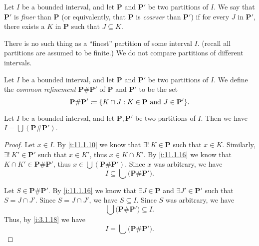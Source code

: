 \begin{defn}\label{i:11.1.14}
  Let \(I\) be a bounded interval, and let \(\mathbf{P}\) and \(\mathbf{P}'\) be two partitions of \(I\).
  We say that \(\mathbf{P}'\) is \emph{finer} than \(\mathbf{P}\) (or equivalently, that \(\mathbf{P}\) is \emph{coarser} than \(\mathbf{P}'\)) if for every \(J\) in \(\mathbf{P}'\), there exists a \(K\) in \(\mathbf{P}\) such that \(J \subseteq K\).
\end{defn}

\begin{note}
  There is no such thing as a ``finest'' partition of some interval \(I\).
  (recall all partitions are assumed to be finite.)
  We do not compare partitions of different intervals.
\end{note}

\setcounter{thm}{15}
\begin{defn}\label{i:11.1.16}
  Let \(I\) be a bounded interval, and let \(\mathbf{P}\) and \(\mathbf{P}'\) be two partitions of \(I\).
  We define the \emph{common refinement} \(\mathbf{P} \# \mathbf{P}'\) of \(\mathbf{P}\) and \(\mathbf{P}'\) to be the set
  \[
    \mathbf{P} \# \mathbf{P}' \coloneqq \set{K \cap J : K \in \mathbf{P} \text{ and } J \in \mathbf{P}'}.
  \]
\end{defn}

\begin{ac}\label{i:ac:11.1.1}
  Let \(I\) be a bounded interval, and let \(\mathbf{P}, \mathbf{P}'\) be two partitions of \(I\).
  Then we have \(I = \bigcup (\mathbf{P} \# \mathbf{P}')\).
\end{ac}

\begin{proof}
  Let \(x \in I\).
  By \cref{i:11.1.10} we know that \(\exists!\ K \in \mathbf{P}\) such that \(x \in K\).
  Similarly, \(\exists!\ K' \in \mathbf{P}'\) such that \(x \in K'\), thus \(x \in K \cap K'\).
  By \cref{i:11.1.16} we know that \(K \cap K' \in \mathbf{P} \# \mathbf{P}'\), thus \(x \in \bigcup (\mathbf{P} \# \mathbf{P}')\).
  Since \(x\) was arbitrary, we have
  \[
    I \subseteq \bigcup \big(\mathbf{P} \# \mathbf{P}'\big).
  \]

  Let \(S \in \mathbf{P} \# \mathbf{P}'\).
  By \cref{i:11.1.16} we know that \(\exists J \in \mathbf{P}\) and \(\exists J' \in \mathbf{P}'\) such that \(S = J \cap J'\).
  Since \(S = J \cap J'\), we have \(S \subseteq I\).
  Since \(S\) was arbitrary, we have
  \[
    \bigcup \big(\mathbf{P} \# \mathbf{P}'\big) \subseteq I.
  \]
  Thus, by \cref{i:3.1.18} we have
  \[
    I = \bigcup \big(\mathbf{P} \# \mathbf{P}'\big).
  \]
\end{proof}

